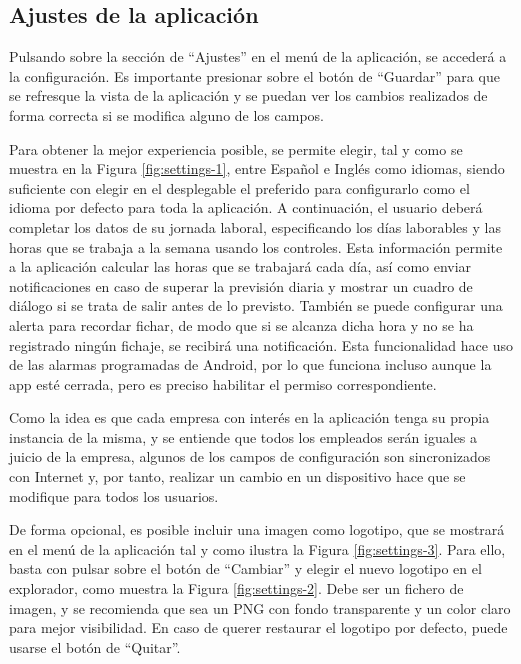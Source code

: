 \subsection{Ajustes de la aplicación}

Pulsando sobre la sección de “Ajustes” en el menú de la aplicación, se accederá a la configuración. Es importante presionar sobre el botón de “Guardar” para que se refresque la vista de la aplicación y se puedan ver los cambios realizados de forma correcta si se modifica alguno de los campos.

Para obtener la mejor experiencia posible, se permite elegir, tal y como se muestra en la Figura \ref{fig:settings-1}, entre Español e Inglés como idiomas, siendo suficiente con elegir en el desplegable el preferido para configurarlo como el idioma por defecto para toda la aplicación. A continuación, el usuario deberá completar los datos de su jornada laboral, especificando los días laborables y las horas que se trabaja a la semana usando los controles. Esta información permite a la aplicación calcular las horas que se trabajará cada día, así como enviar notificaciones en caso de superar la previsión diaria y mostrar un cuadro de diálogo si se trata de salir antes de lo previsto. También se puede configurar una alerta para recordar fichar, de modo que si se alcanza dicha hora y no se ha registrado ningún fichaje, se recibirá una notificación. Esta funcionalidad hace uso de las alarmas programadas de Android, por lo que funciona incluso aunque la app esté cerrada, pero es preciso habilitar el permiso correspondiente.

\begin{tcolorbox}
    [colback=black!5!white,colframe=black!75!black,fonttitle=\bfseries,title=Sincronización con Internet]
     Como la idea es que cada empresa con interés en la aplicación tenga su propia instancia de la misma, y se entiende que todos los empleados serán iguales a juicio de la empresa, algunos de los campos de configuración son sincronizados con Internet y, por tanto, realizar un cambio en un dispositivo hace que se modifique para todos los usuarios.
    \end{tcolorbox}

De forma opcional, es posible incluir una imagen como logotipo, que se mostrará en el menú de la aplicación tal y como ilustra la Figura \ref{fig:settings-3}. Para ello, basta con pulsar sobre el botón de “Cambiar” y elegir el nuevo logotipo en el explorador, como muestra la Figura \ref{fig:settings-2}. Debe ser un fichero de imagen, y se recomienda que sea un PNG con fondo transparente y un color claro para mejor visibilidad. En caso de querer restaurar el logotipo por defecto, puede usarse el botón de “Quitar”.

